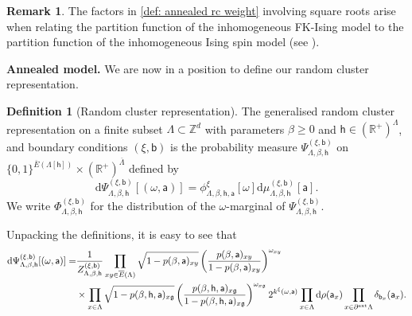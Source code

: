 \documentclass[11pt,a4paper]{article}
\numberwithin{equation}{section}
\theoremstyle{plain}
\theoremstyle{definition}
\newtheorem{Def}[Thm]{Definition}
\newtheorem{Rem}[Thm]{Remark}
\newcommand\fg{\mathfrak{g}}
\begin{document}
\begin{Rem}
The factors in \eqref{def: annealed rc weight} involving square roots arise when relating the partition function of the inhomogeneous FK-Ising model to the partition function of the inhomogeneous Ising spin model (see \cite{gunaratnam2025supercritical}). 
\end{Rem}

\hfill

\noindent\textbf{Annealed model.} We are now in a position to define our random cluster representation.

\begin{Def}[Random cluster representation]
The generalised random cluster representation on a finite subset $\Lambda \subset \mathbb Z^d$ with parameters $\beta\geq  0$ and $\mathsf h\in (\mathbb R^+)^\Lambda$, and boundary conditions $(\xi,\mathsf{b})$ is the probability measure $\Psi^{(\xi,\mathsf{b})}_{\Lambda,\beta,\mathsf h}$ on $ \{0,1\}^{\overline E(\Lambda[\mathsf h])}\times (\mathbb R^+)^{\overline \Lambda} $ defined by
\begin{equation}
\mathrm{d}\Psi^{(\xi,\mathsf{b})}_{\Lambda,\beta,\mathsf h}[(\omega,\mathsf a)] = \phi^\xi_{\Lambda, \beta, \mathsf h, \mathsf a}[\omega] \mathrm{d}\mu^{(\xi,\mathsf{b})}_{\Lambda, \beta, \mathsf h}[\mathsf a].
\end{equation}
We write $\Phi^{(\xi,\mathsf{b})}_{\Lambda,\beta,\mathsf{h}}$ for the distribution of the $\omega$-marginal of $\Psi^{(\xi,\mathsf{b})}_{\Lambda,\beta,\mathsf h}$.
\end{Def}

Unpacking the definitions, it is easy to see that
\begin{equation}\label{eq: random cluster explicit density}
\begin{aligned}
\mathrm{d}\Psi_{\Lambda,\beta,\mathsf{h}}^{(\xi,\mathsf{b})}[(\omega,\mathsf{a})]=&\frac{1}{Z^{(\xi,\mathsf{b})}_{\Lambda,\beta,\mathsf{h}}}\prod_{xy \in \overline{E}(\Lambda)} \sqrt{1-p(\beta,\mathsf a)_{xy}}\left(\frac{p(\beta,\mathsf a)_{xy}}{1-p(\beta,\mathsf a)_{xy}}\right)^{\omega_{xy}} \, \\
& \times \prod_{x\in \Lambda} \sqrt{1-p(\beta, \mathsf h, \mathsf a)_{x\fg}}\left(\frac{p(\beta, \mathsf{h}, \mathsf a)_{x\fg}}{1-p(\beta,\mathsf{h}, \mathsf a)_{x\fg}}\right)^{\omega_{x\fg}} 2^{k^\xi(\omega,\mathsf{a})} 
\prod_{x\in \Lambda}\mathrm{d} \rho(\mathsf{a}_x)\prod_{x \in \partial^{\textup{ext}} \Lambda} \delta_{\mathsf{b}_x}(\mathsf{a}_x).
\end{aligned}
\end{equation}
\end{document}
